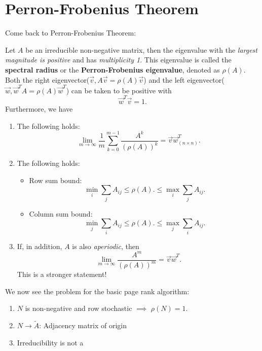 \section{Perron-Frobenius Theorem}
Come back to Perron-Frobenius Theorem:
\begin{theorem}\label{Perron-Frobenius Theorem}
	Let \(A\) be an irreducible non-negative matrix, then the eigenvalue with the \emph{largest magnitude is positive}
	and has \emph{multiplicity 1}. This eigenvalue is called the \textbf{spectral radius} or the \textbf{Perron-Frobenius eigenvalue},
	denoted as \(\rho(A)\).
	Both the right eigenvector(\(\vec{v}, A \vec{v} = \rho(A) \vec{v}\)) and the left eigenvector(\(\vec{w}, \vec{w}^{T}A = \rho(A) \vec{w}^{T}\))
	can be taken to be positive with
	\[
		\vec{w}^{T} \vec{v} = 1.
	\]
	Furthermore, we have
	\begin{enumerate}
		\item The following holds:
		      \[
			      \lim_{m \to \infty} \frac{1}{m} \sum\limits_{k=0}^{m-1} \frac{A^k}{(\rho(A))^k} = \vec{v} \vec{w}^{T}_{(n\times n)}.
		      \]
		\item The following holds:
		      \begin{itemize}
			      \item Row sum bound:
			            \[
				            \min_i \sum\limits_{j} A_{ij} \leq \rho(A).\leq \max_i \sum\limits_{j} A_{ij}.
			            \]
			      \item Column sum bound:
			            \[
				            \min_j \sum\limits_{i} A_{ij} \leq \rho(A).\leq \max_j \sum\limits_{i} A_{ij}.
			            \]
		      \end{itemize}
		\item If, in addition, \(A\) is also \emph{aperiodic}, then
		      \[
			      \lim_{m \to \infty} \frac{A^m}{(\rho(A))^m} = \vec{v} \vec{w}^{T}.
		      \]
		      This is a stronger statement!
	\end{enumerate}
\end{theorem}

\begin{problem}
We now see the problem for the basic page rank algorithm:
\begin{enumerate}
	\item \(N\) is non-negative and row stochastic \(\implies\) \(\rho(N) = 1\).
	\item \(N \to \widetilde{A}\): Adjacency matrix of origin
	\item Irreducibility is not a
\end{enumerate}
\end{problem}

